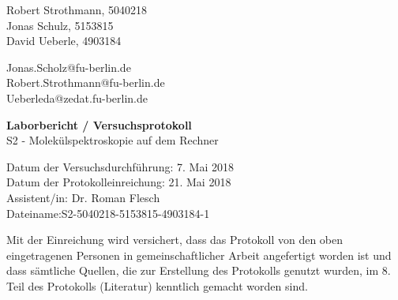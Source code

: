 %


%
\thispagestyle{empty}

\begin{flushleft}
Robert Strothmann, 5040218\\ 
Jonas Schulz, 5153815\\ 
David Ueberle, 4903184\\ 
\end{flushleft}
\vspace*{0.3cm}
Jonas.Scholz@fu-berlin.de\\
Robert.Strothmann@fu-berlin.de\\
Ueberleda@zedat.fu-berlin.de\\
\begin{center}
	\vspace*{1cm}
	\Large
	{ \bfseries Laborbericht / Versuchsprotokoll}\\
	\vspace*{1cm}
	{S2 - Molekülspektroskopie auf dem Rechner}\\
\end{center}
	\vspace*{1cm}
	{Datum der Versuchsdurchführung: 7. Mai 2018}\\
	{Datum der Protokolleinreichung: 21. Mai 2018}\\
	{Assistent/in: Dr. Roman Flesch}\\
	{Dateiname:S2-5040218-5153815-4903184-1}	
	\vfill
\begin{flushleft}
Mit der Einreichung wird versichert, dass das Protokoll von den oben eingetragenen Personen in gemeinschaftlicher Arbeit angefertigt worden ist und dass sämtliche Quellen, die zur Erstellung des Protokolls genutzt wurden, im 8. Teil des Protokolls (Literatur) kenntlich gemacht worden sind.
\end{flushleft}

\normalsize
\newpage
%